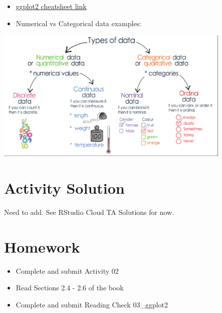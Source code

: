 \documentclass[
  letterpaper,
  DIV=11,
  numbers=noendperiod]{scrreprt}
\begin{document}
\begin{tcolorbox}[enhanced jigsaw, breakable, colback=white, bottomrule=.15mm, leftrule=.75mm, colframe=quarto-callout-note-color-frame, arc=.35mm, rightrule=.15mm, toprule=.15mm, left=2mm, opacityback=0]

\begin{itemize}
\item
  \href{https://www.rstudio.com/resources/cheatsheets/}{ggplot2
  cheatsheet link}
\item
  Numerical vs Categorical data examples:
\end{itemize}

\includegraphics[width=\textwidth,height=2.5in]{images/images_lecture/data_types.png}
\end{tcolorbox}

\hypertarget{activity-solution-1}{%
\section*{Activity Solution}\label{activity-solution-1}}

Need to add. See RStudio Cloud TA Solutions for now.

\hypertarget{homework-2}{%
\section*{Homework}\label{homework-2}}

\begin{itemize}
\item
  Complete and submit Activity 02
\item
  Read Sections 2.4 - 2.6 of the book
\item
  Complete and submit Reading Check 03\_ggplot2
\end{itemize}
\end{document}
